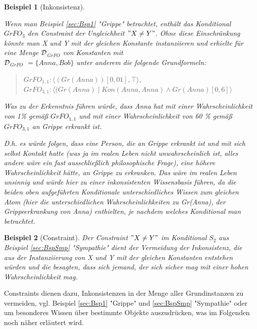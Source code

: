 \documentclass[a4paper, 11pt]{book}
\newtheorem{Bsp}{Beispiel}[section]
\begin{document}
\begin{Bsp}[Inkonsistenz]
\label{sec:Bsp}

Wenn man Beispiel \ref{sec:Bsp1} "{}Grippe"{} betrachtet, enthält das Konditional $ GrFO_{3}$ den Constraint der Ungleichheit $ "{} X \neq Y "{} $. Ohne diese Einschränkung könnte man X und Y mit der gleichen Konstante instanziieren und erhielte  für eine Menge $ \cal D $$_{GrFO} $ von Konstanten mit\\
 $ \cal D $$_{GrFO}  $ $ = \{Anna, Bob \} $ unter anderem die folgende Grundformeln:\\
 \begin{quote}
 	$ GrFO_{1, 1}  :  \langle (Gr(Anna))[0,01], \top \rangle $,\\
 	$ GrFO_{3, 1} : \langle (Gr(Anna) \mid Kon(Anna, Anna) \wedge Gr(Anna)[0,6]  \rangle$\\
 \end{quote}
  Was zu der Erkenntnis führen würde, dass Anna hat mit einer Wahrscheinlichkeit von 1\% gemäß  $ GrFO_{1, 1}  $ und mit einer Wahrscheinlichkeit von 60 \% gemäß $ GrFO_{3, 1}  $ an Grippe erkrankt ist. 
  
 D.h. es würde folgen, dass eine Person, die an Grippe erkrankt ist und mit sich selbst Kontakt hatte (was ja im realen Leben nicht unwahrscheinlich ist, alles andere wäre ein fast ausschließlich philosophische Frage), eine höhere Wahrscheinlichkeit hätte, an Grippe zu erkranken. Das wäre im realen Leben unsinnig und würde hier zu einer inkonsistenten Wissensbasis führen, da die beiden oben aufgeführten Konditionale unterschiedliches Wissen zum gleichen Atom (hier die unterschiedlichen Wahrscheinlichkeiten zu Gr(Anna), der Grippeerkrankung von Anna) enthielten, je nachdem welches Konditional man betrachtet. 



\end{Bsp}

\begin{Bsp}[Constraint]
\label{sec:BspConstraint}
Der Constraint $ "{} X \neq Y "{} $ im Konditional $ S_{2} $ aus Beispiel \ref{sec:BspSmp} "{}Sympathie"{} dient der Vermeidung der Inkonsistenz, die aus der Instanziierung von X und Y mit der gleichen Konstanten entstehen würden und die besagten, dass sich jemand, der sich sicher mag mit einer hohen Wahrscheinlichkeit mag. 
\end{Bsp}
Constraints dienen dazu, Inkonsistenzen in der Menge aller Grundinstanzen  zu vermeiden, vgl. Beispiel \ref{sec:Bsp1} "{}Grippe"{}  und \ref{sec:BspSmp} "{}Sympathie"{} oder um besonderes Wissen über bestimmte Objekte auszudrücken, was im Folgenden noch näher erläutert wird.
\end{document}
